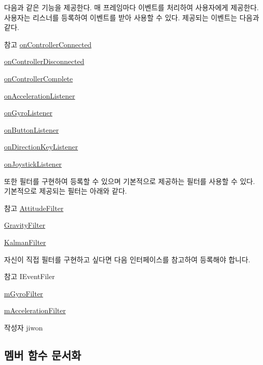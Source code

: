 다음과 같은 기능을 제공한다. 매 프레임마다 이벤트를 처리하여 사용자에게 제공한다. 사용자는 리스너를 등록하여 이벤트를 받아 사용할 수 있다. 제공되는 이벤트는 다음과 같다. \begin{DoxySeeAlso}{참고}
\hyperlink{class_event_manager_a1982ee974be3949930955adbf2b69416}{on\+Controller\+Connected} 

\hyperlink{class_event_manager_a8f4ec7cfc6f0ca0d4a5872997b359861}{on\+Controller\+Disconnected} 

\hyperlink{class_event_manager_af12f0caee161b1b2222cfd13cd957750}{on\+Controller\+Complete} 

\hyperlink{class_event_manager_a653a885d332bd10bf53a1f8e6a8c36cd}{on\+Acceleration\+Listener} 

\hyperlink{class_event_manager_a31f1da96e98896421b0026df5ce01623}{on\+Gyro\+Listener} 

\hyperlink{class_event_manager_a6f4d5e2ed1262c99f3295743878ba681}{on\+Button\+Listener} 

\hyperlink{class_event_manager_aabcdea295255f84519ce6c7ef7026b64}{on\+Direction\+Key\+Listener} 

\hyperlink{class_event_manager_ab148217093b03a8cd7c962a11195c83a}{on\+Joystick\+Listener}
\end{DoxySeeAlso}
또한 필터를 구현하여 등록할 수 있으며 기본적으로 제공하는 필터를 사용할 수 있다. 기본적으로 제공되는 필터는 아래와 같다. \begin{DoxySeeAlso}{참고}
\hyperlink{class_attitude_filter}{Attitude\+Filter} 

\hyperlink{class_gravity_filter}{Gravity\+Filter} 

\hyperlink{class_kalman_filter}{Kalman\+Filter}
\end{DoxySeeAlso}
자신이 직접 필터를 구현하고 싶다면 다음 인터페이스를 참고하여 등록해야 합니다. \begin{DoxySeeAlso}{참고}
I\+Event\+Filer 

\hyperlink{class_event_manager_a7cee85488f5d7220c102cd945b1f494a}{m\+Gyro\+Filter} 

\hyperlink{class_event_manager_a2e8707f51be09be7f400bd9cca230b3a}{m\+Acceleration\+Filter}
\end{DoxySeeAlso}
\begin{DoxyAuthor}{작성자}
jiwon 
\end{DoxyAuthor}


\subsection{멤버 함수 문서화}
\hypertarget{class_event_manager_ac459bcb4ba4f140243e271628f8d366c}{}
